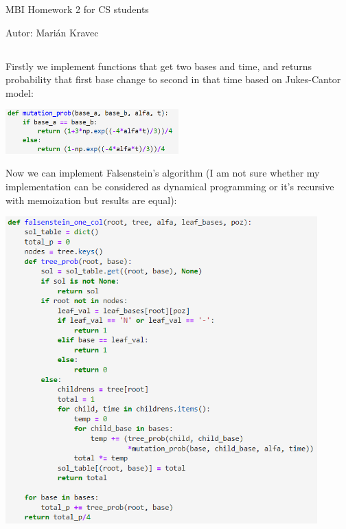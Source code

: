 \documentclass[a4paper]{article}
\begin{document}
 
	
	\pagestyle{plain}
	
	\begin{center}
		\sc\large
		MBI Homework 2 for CS students
	\end{center}
	
	Autor: Marián Kravec
	
	\subsection{}
	
	Firstly we implement functions that get two bases and time, and returns probability that first base change to second in that time based on Jukes-Cantor model:
	
	\centerline{\includegraphics[width=0.5\textwidth]{mut_prob}} 
	
	Now we can implement Falsenstein's algorithm (I am not sure whether my implementation can be considered as dynamical programming or it's recursive with memoization but results are equal):
	
	\centerline{\includegraphics[width=0.9\textwidth]{falsenstein}} 
	
	\newpage
	\subsection{}
	
\end{document}
